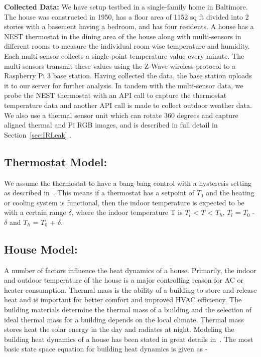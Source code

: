 \indent \textbf{Collected Data:} We have setup testbed in a single-family home in Baltimore. The house was constructed in 1950, has a floor area of 1152 sq ft divided into 2 stories with a basement having a bedroom, and has four residents. A house has a NEST thermostat in the dining area of the house along with multi-sensors \cite{Aeotec} in different rooms to measure the individual room-wise temperature and humidity. Each multi-sensor collects a single-point
temperature value every minute. The multi-sensors transmit these values using the Z-Wave wireless protocol to a Raspberry Pi 3 base station. Having collected the data, the base station uploads it to our server for further analysis. In tandem with the multi-sensor data, we probe the NEST thermostat with an API call to capture the thermostat temperature data and another API call is made to collect outdoor weather data. We also use a thermal sensor unit which can rotate 360 degrees and capture aligned thermal and Pi RGB images, and is described in full detail in Section~\ref{sec:IRLeak}
.   
\subsection{Thermostat Model:}

\indent We assume the thermostat to have a bang-bang control with a hysteresis setting as described in~\cite{Thermostat}. This means if a thermostat has a setpoint of $T_0$ and the heating or cooling system is functional, then the indoor temperature is expected to be with a certain range $\delta$, where the indoor temperature T is $T_l$ < $T$ < $T_h$, $T_l$ = $T_0$ - $\delta$  and $T_h$ = $T_0$ + $\delta$. 

\subsection{House Model:} 

 A number of factors influence the heat dynamics of a house. Primarily, the indoor and outdoor temperature of the house is a major controlling reason for AC or heater consumption. Thermal mass is the ability of a building to store and release heat and is important for better comfort and improved HVAC efficiency. The building materials determine the thermal mass of a building and the selection of ideal thermal mass for a building depends on the local climate. Thermal mass stores heat the solar energy in the day and radiates at night. Modeling the building heat dynamics of a house has been stated in great details in~\cite{building}. The most basic state space equation for building heat dynamics is given as - 

